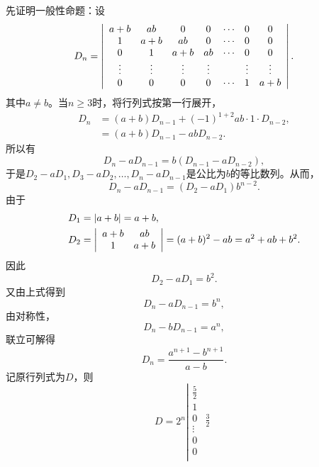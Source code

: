 \begin{enumerate}[1~]
\begin{enumerate}[1.~]
\begin{solution}
先证明一般性命题：设\[
D _ { n } = \left| \begin{array} { c c c c c c c } { a + b } & { a b } & { 0 } & { 0 } & { \cdots } & { 0 } & { 0 } \\ { 1 } & { a + b } & { a b } & { 0 } & { \cdots } & { 0 } & { 0 } \\ { 0 } & { 1 } & { a + b } & { a b } & { \cdots } & { 0 } & { 0 } \\ { \vdots } & { \vdots } & { \vdots } & { \vdots } & { } & { \vdots } & { \vdots } \\ { 0 } & { 0 } & { 0 } & { 0 } & { \cdots } & { 1 } & { a + b } \end{array} \right|.
\]
其中$a \neq b$。当$n \ge 3$时，将行列式按第一行展开，
\begin{align*} 
D _ { n } & = ( a + b ) D _ { n - 1 } + ( - 1 ) ^ { 1 + 2 } a b \cdot 1 \cdot D _ { n - 2 }, \\ 
& = ( a + b ) D _ { n - 1 } - a b D _ { n - 2 }. \end{align*}
所以有\[
D _ { n } - a D _ { n - 1 } = b \left( D _ { n - 1 } - a D _ { n - 2 } \right),
\]
于是$D _ { 2 } - a D _ { 1 } , D _ { 3 } - a D _ { 2 } , \dots , D _ { n } - a D _ { n - 1 }$是公比为$b$的等比数列。从而，
\[
D _ { n } - a D _ { n - 1 } = \left( D _ { 2 } - a D _ { 1 } \right) b ^ { n - 2 }.
\]
由于\begin{align*}
D _ { 1 } &= | a + b | = a + b,\\
D _ { 2 } &= \left| \begin{array} { c c } { a + b } & { a b } \\ { 1 } & { a + b } \end{array} \right| = ( a + b ) ^ { 2 } - a b = a ^ { 2 } + a b + b ^ { 2 }.
\end{align*}
因此\[
D _ { 2 } - a D _ { 1 } = b ^ { 2 }.
\]
又由上式得到\[
D _ { n } - a D _ { n - 1 } = b ^ { n },
\]
由对称性，\[
D _ { n } - b D _ { n - 1 } = a ^ { n },
\]
联立可解得\[
D _ { n } = \frac { a ^ { n + 1 } - b ^ { n + 1 } } { a - b }.
\]
记原行列式为$D$，则\[
D=2^n \left| \begin{array}{c}
	\frac52\\
	1\\
	0\\
	\vdots\\
	0\\
	0\\
\end{array}\begin{array}{c}
	\frac32\\

\end{array}\]
\end{solution}
\end{enumerate}
\end{enumerate}
